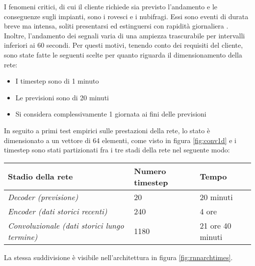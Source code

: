 I fenomeni critici, di cui il cliente richiede sia previsto l’andamento e le conseguenze sugli impianti, sono i rovesci e i nubifragi. Essi sono eventi di durata breve ma intensa, soliti presentarsi ed estinguersi con rapidità giornaliera \cite{giuliacci_giuliacci_corazzon_2010}. Inoltre, l’andamento dei segnali varia di una ampiezza trascurabile per intervalli inferiori ai 60 secondi. Per questi motivi, tenendo conto dei requisiti del cliente, sono state fatte le seguenti scelte per quanto riguarda il dimensionamento della rete:
\begin{itemize}
	\item I timestep sono di 1 minuto
	\item Le previsioni sono di 20 minuti
	\item Si considera complessivamente 1 giornata ai fini delle previsioni
\end{itemize}
In seguito a primi test empirici sulle prestazioni della rete, lo stato è dimensionato a un vettore di 64 elementi, come visto in figura \ref{fig:conv1d} e i timestep sono stati partizionati fra i tre stadi della rete nel seguente modo:
\newline
	\begin{tabular}{|lll|}
		\hline
		\textbf{Stadio della rete}                           & \textbf{Numero timestep} & \textbf{Tempo}   \\ \hline
		\textit{Decoder (previsione)}                        & 20                       & 20 minuti        \\
		\textit{Encoder (dati storici recenti)}              & 240                      & 4 ore            \\
		\textit{Convoluzionale (dati storici lungo termine)} & 1180                     & 21 ore 40 minuti \\ \hline
	\end{tabular}
\newline\newline
La stessa suddivisione è visibile nell'architettura in figura \ref{fig:rnnarchtimes}.
